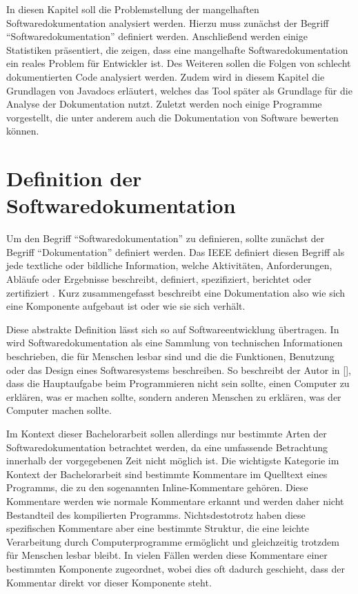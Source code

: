 \label{sec:background}
In diesen Kapitel soll die Problemstellung der mangelhaften Softwaredokumentation analysiert werden. Hierzu muss zunächst der Begriff \enquote{Softwaredokumentation} definiert werden. Anschließend werden einige Statistiken präsentiert, die zeigen, dass eine mangelhafte Softwaredokumentation ein reales Problem für Entwickler ist. Des Weiteren sollen die Folgen von schlecht dokumentierten Code analysiert werden. Zudem wird in diesem Kapitel die Grundlagen von Javadocs erläutert, welches das Tool später als Grundlage für die Analyse der Dokumentation nutzt. Zuletzt werden noch einige Programme vorgestellt, die unter anderem auch die Dokumentation von Software bewerten können. 

\section{Definition der Softwaredokumentation}
Um den Begriff \enquote{Softwaredokumentation} zu definieren, sollte zunächst der Begriff \enquote{Dokumentation} definiert werden. Das IEEE  definiert diesen Begriff als jede textliche oder bildliche Information, welche Aktivitäten, Anforderungen, Abläufe oder Ergebnisse beschreibt, definiert, spezifiziert, berichtet oder zertifiziert \cite[S. 28]{IEEEStandardGlossaryofSoftwareEngineeringTerminology}. Kurz zusammengefasst beschreibt eine Dokumentation also wie sich eine Komponente aufgebaut ist oder wie sie sich verhält. 

Diese abstrakte Definition lässt sich so auf Softwareentwicklung übertragen. In \cite[S. 125]{Softwaredocumentationandstandards} wird Softwaredokumentation als eine Sammlung von technischen Informationen beschrieben, die für Menschen lesbar sind und die die Funktionen, Benutzung oder das Design eines Softwaresystems beschreiben. So beschreibt der Autor in [], dass die Hauptaufgabe beim Programmieren nicht sein sollte, einen Computer zu erklären, was er machen sollte, sondern anderen Menschen zu erklären, was der Computer machen sollte.

Im Kontext dieser Bachelorarbeit sollen allerdings nur bestimmte Arten der Softwaredokumentation betrachtet werden, da eine umfassende Betrachtung innerhalb der vorgegebenen Zeit nicht möglich ist. Die wichtigste Kategorie im Kontext der Bachelorarbeit sind bestimmte Kommentare im Quelltext eines Programms, die zu den sogenannten Inline-Kommentare gehören. Diese Kommentare werden wie normale Kommentare erkannt und werden daher nicht Bestandteil des kompilierten Programms. Nichtsdestotrotz haben diese spezifischen Kommentare aber eine bestimmte Struktur, die eine leichte Verarbeitung durch Computerprogramme ermöglicht und gleichzeitig trotzdem für Menschen lesbar bleibt. In vielen Fällen werden diese Kommentare einer bestimmten Komponente zugeordnet, wobei dies oft dadurch geschieht, dass der Kommentar direkt vor dieser Komponente steht. 

